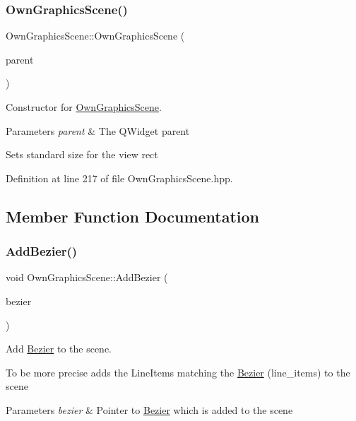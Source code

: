 \subsubsection{\texorpdfstring{Own\+Graphics\+Scene()}{OwnGraphicsScene()}}
{\footnotesize\ttfamily Own\+Graphics\+Scene\+::\+Own\+Graphics\+Scene (\begin{DoxyParamCaption}\item[{Q\+Widget $\ast$}]{parent }\end{DoxyParamCaption})\hspace{0.3cm}{\ttfamily [inline]}}



Constructor for \mbox{\hyperlink{classOwnGraphicsScene}{Own\+Graphics\+Scene}}. 


\begin{DoxyParams}{Parameters}
{\em parent} & The Q\+Widget parent\\
\hline
\end{DoxyParams}
Sets standard size for the view rect 

Definition at line 217 of file Own\+Graphics\+Scene.\+hpp.



\subsection{Member Function Documentation}
\mbox{\label{classOwnGraphicsScene_ac0c5440d16675d6bf8c27767d2721622}} 
\subsubsection{\texorpdfstring{Add\+Bezier()}{AddBezier()}}
{\footnotesize\ttfamily void Own\+Graphics\+Scene\+::\+Add\+Bezier (\begin{DoxyParamCaption}\item[{\mbox{\hyperlink{classBezier}{Bezier}} $\ast$}]{bezier }\end{DoxyParamCaption})}



Add \mbox{\hyperlink{classBezier}{Bezier}} to the scene. 

To be more precise adds the Line\+Items matching the \mbox{\hyperlink{classBezier}{Bezier}} (line\+\_\+items) to the scene 
\begin{DoxyParams}{Parameters}
{\em bezier} & Pointer to \mbox{\hyperlink{classBezier}{Bezier}} which is added to the scene \\
\hline
\end{DoxyParams}


